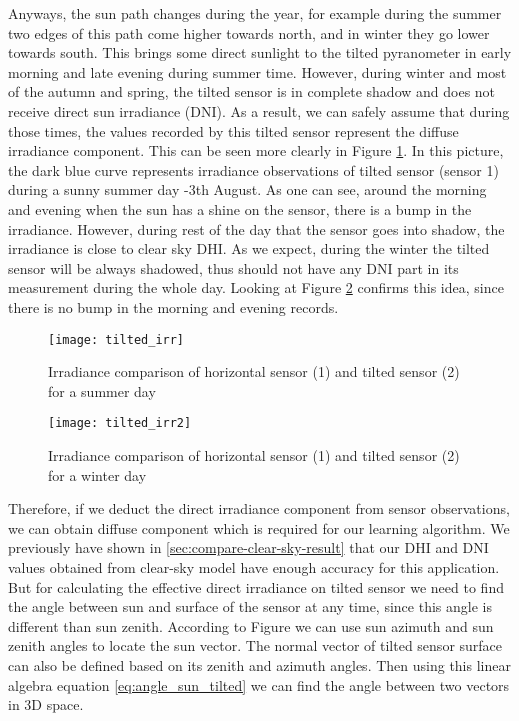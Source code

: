 Anyways, the sun path changes during the year, for example during the summer two edges of this path come higher towards north, and in winter they go lower towards south. This brings some direct sunlight to the tilted pyranometer in early morning and late evening during summer time. However, during winter and most of the autumn and spring, the tilted sensor is in complete shadow and does not receive direct sun irradiance (DNI). As a result, we can safely assume that during those times, the values recorded by this tilted sensor represent the diffuse irradiance component. This can be seen more clearly in Figure \ref{fig:tilted_irr_cmp}. In this picture, the dark blue curve represents irradiance observations of tilted sensor (sensor 1) during a sunny summer day -3th August. As one can see, around the morning and evening when the sun has a shine on the sensor, there is a bump in the irradiance. However, during rest of the day that the sensor goes into shadow, the irradiance is close to clear sky DHI. As we expect, during the winter the tilted sensor will be always shadowed, thus should not have any DNI part in its measurement during the whole day. Looking at Figure \ref{fig:tilted_irr_cmp2} confirms this idea, since there is no bump in the morning and evening records.

\begin{figure}[h]
\caption{Irradiance comparison of horizontal sensor (1) and tilted sensor (2) for a summer day}
\label{fig:tilted_irr_cmp}
\texttt{[image: tilted\_irr]}
\centering
\end{figure}

\begin{figure}[h]
\caption{Irradiance comparison of horizontal sensor (1) and tilted sensor (2) for a winter day}
\label{fig:tilted_irr_cmp2}
\texttt{[image: tilted\_irr2]}
\centering
\end{figure}

Therefore, if we deduct the direct irradiance component from sensor observations, we can obtain diffuse component which is required for our learning algorithm.  We previously have shown in \ref{sec:compare-clear-sky-result} that our DHI and DNI values obtained from clear-sky model have enough accuracy for this application. But for calculating the effective direct irradiance on tilted sensor we need to find the angle between sun and surface of the sensor at any time, since this angle is different than sun zenith. According to Figure we can use sun azimuth and sun zenith angles to locate the sun vector. The normal vector of tilted sensor surface can also be defined based on its zenith and azimuth angles. Then using this linear algebra equation \ref{eq:angle_sun_tilted} we can find the angle between two vectors in 3D space.

